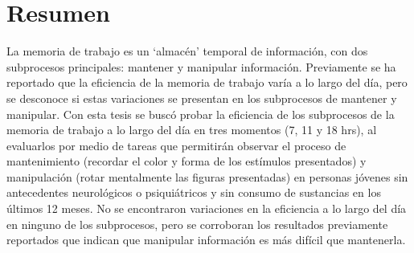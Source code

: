 \documentclass[12pt,letterpaper,final]{article}
\begin{document}


\newpage
{}

\doublespacing


\section*{Resumen}

La memoria de trabajo es un `almacén' temporal de información, con dos subprocesos principales: mantener y manipular información. Previamente se ha reportado que la eficiencia de la memoria de trabajo varía a lo largo del día, pero se desconoce si estas variaciones se presentan en los subprocesos de mantener y manipular. Con esta tesis se buscó probar la eficiencia de los subprocesos de la memoria de trabajo a lo largo del día en tres momentos (7, 11 y 18 hrs), al evaluarlos por medio de tareas que permitirán observar el proceso de mantenimiento (recordar el color y forma de los estímulos presentados) y manipulación (rotar mentalmente las figuras presentadas) en personas jóvenes sin antecedentes neurológicos o psiquiátricos y sin consumo de sustancias en los últimos 12 meses. No se encontraron variaciones en la eficiencia a lo largo del día en ninguno de los subprocesos, pero se corroboran los resultados previamente reportados que indican que manipular información es más difícil que mantenerla.
\newpage
\end{document}
